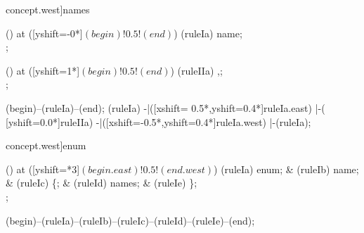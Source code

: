 \begin{syntax}[[xshift=24mm]concept.west]{names}
  
  \node[sequence] () at ([yshift=-0*\syntaxruledist]$(begin)!0.5!(end)$) {
    \node[nonterminal]    (ruleIa) {name};
    \\
  };
  
  \node[sequence] () at ([yshift=1*\syntaxruledist]$(begin)!0.5!(end)$) {
    \node[terminal]    (ruleIIa) {,};
    \\
  };
  
  \draw[path] (begin)--(ruleIa)--(end);
  \draw[path] (ruleIa)
            -|([xshift= 0.5*\syntaxruledist,yshift=0.4*\syntaxruledist]ruleIa.east)
            |-(                            [yshift=0.0*\syntaxruledist]ruleIIa)
            -|([xshift=-0.5*\syntaxruledist,yshift=0.4*\syntaxruledist]ruleIa.west)
            |-(ruleIa);
\end{syntax}

\begin{syntax}[[xshift=22mm]concept.west]{enum}
  
  \node[sequence,anchor=north] () at ([yshift=\syntaxrulenodeheight-0.8pt*3]$(begin.east)!0.5!(end.west)$) {
    \node[terminal]    (ruleIa) {enum};
    &
    \node[terminal]    (ruleIb) {name};
    &
    \node[terminal]    (ruleIc) {\{};
    &
    \node[nonterminal] (ruleId) {names};
    &
    \node[terminal]    (ruleIe) {\}};
    \\
  };
  
  \draw[path] (begin)--(ruleIa)--(ruleIb)--(ruleIc)--(ruleId)--(ruleIe)--(end);
\end{syntax}
